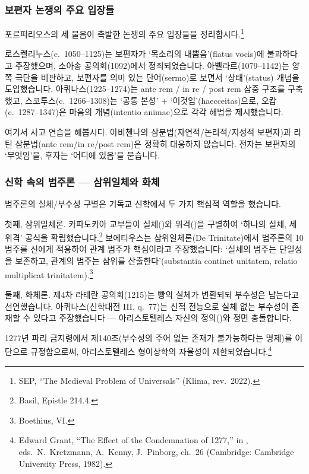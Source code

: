 \documentclass[12pt, a4paper]{article}
\begin{document}
\subsubsection{보편자 논쟁의 주요 입장들}

포르피리오스의 세 물음이 촉발한 논쟁의 주요 입장들을 정리합시다.\footnote{SEP, ``The Medieval Problem of Universals'' (Klima, rev.\ 2022).}

로스켈리누스(c.\ 1050--1125)는 보편자가 `목소리의 내뿜음'(flatus vocis)에 불과하다고 주장했으며, 소아송 공의회(1092)에서 정죄되었습니다. 아벨라르(1079--1142)는 양쪽 극단을 비판하고, 보편자를 의미 있는 단어(sermo)로 보면서 `상태'(status) 개념을 도입했습니다. 아퀴나스(1225--1274)는 ante rem / in re / post rem 삼중 구조를 구축했고, 스코투스(c.\ 1266--1308)는 `공통 본성' + `이것임'(haecceitas)으로, 오캄(c.\ 1287--1347)은 마음의 개념(intentio animae)으로 각각 해법을 제시했습니다.

여기서 사고 연습을 해봅시다. 아비첸나의 삼분법(자연적/논리적/지성적 보편자)과 라틴 삼분법(ante rem/in re/post rem)은 정확히 대응하지 않습니다. 전자는 보편자의 `무엇임'을, 후자는 `어디에 있음'을 묻습니다.

\subsubsection{신학 속의 범주론 --- 삼위일체와 화체}

범주론의 실체/부수성 구별은 기독교 신학에서 두 가지 핵심적 역할을 했습니다.

첫째, 삼위일체론. 카파도키아 교부들이 실체()와 위격()을 구별하여 `하나의 실체, 세 위격' 공식을 확립했습니다.\footnote{Basil, Epistle 214.4.} 보에티우스는 삼위일체론(De Trinitate)에서 범주론의 10범주를 신에게 적용하여 관계 범주가 핵심이라고 주장했습니다: `실체의 범주는 단일성을 보존하고, 관계의 범주는 삼위를 산출한다'(substantia continet unitatem, relatio multiplicat trinitatem).\footnote{Boethius,  VI.}

둘째, 화체론. 제4차 라테란 공의회(1215)는 빵의 실체가 변환되되 부수성은 남는다고 선언했습니다. 아퀴나스(신학대전 III, q.\ 77)는 신적 전능으로 실체 없는 부수성이 존재할 수 있다고 주장했습니다 --- 아리스토텔레스 자신의 정의()와 정면 충돌합니다.

1277년 파리 금지령에서 제140조(부수성의 주어 없는 존재가 불가능하다는 명제)를 이단으로 규정함으로써, 아리스토텔레스 형이상학의 자율성이 제한되었습니다.\footnote{Edward Grant, ``The Effect of the Condemnation of 1277,'' in , eds.\ N.\ Kretzmann, A.\ Kenny, J.\ Pinborg, ch.\ 26 (Cambridge: Cambridge University Press, 1982).}
\end{document}

